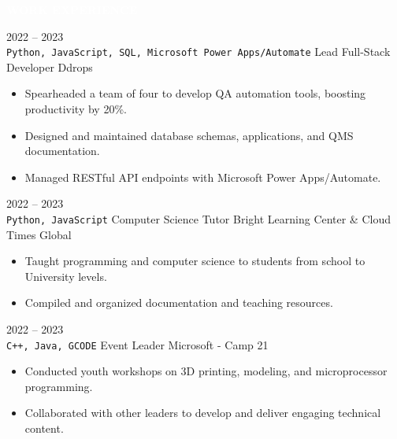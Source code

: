 \documentclass[9pt]{src/developercv} %
\begin{document}

\vspace{\baselineskip} %
\colorbox{sky900}{\textcolor{white}{\LARGE\MakeUppercase{\textbf{Work Experience}}}}\\%

\begin{entrylist}
	\entry
		{2022 -- 2023\\\footnotesize{\texttt{Python, JavaScript, SQL, Microsoft Power Apps/Automate}}\hfill}
		{Lead Full-Stack Developer}
		{Ddrops}
		{\begin{itemize}
			\item Spearheaded a team of four to develop QA automation tools, boosting productivity by 20\%.
			\item Designed and maintained database schemas, applications, and QMS documentation.
			\item Managed RESTful API endpoints with Microsoft Power Apps/Automate.
		\end{itemize}}
	\entry
        {2022 -- 2023\\\footnotesize{\texttt{Python, JavaScript}}\hfill}
		{Computer Science Tutor}
		{Bright Learning Center \& Cloud Times Global}
		{\begin{itemize}
			\item Taught programming and computer science to students from school to University levels.
			\item Compiled and organized documentation and teaching resources.
		\end{itemize}}
	\entry
        {2022 -- 2023\\\footnotesize{\texttt{C++, Java, GCODE}}\hfill}
		{Event Leader}
		{Microsoft - Camp 21}
		{\begin{itemize}
			\item Conducted youth workshops on 3D printing, modeling, and microprocessor programming.
			\item Collaborated with other leaders to develop and deliver engaging technical content.
		\end{itemize}}
\end{entrylist}

\end{document}
